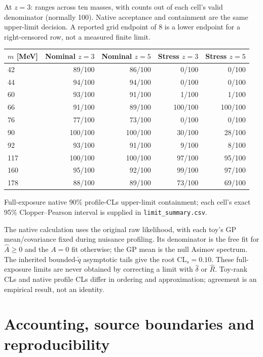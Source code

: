 \documentclass[10pt]{article}
\newcommand{\Ah}{\widehat A}\newcommand{\sh}{\widehat\sigma}
\newcommand{\CLs}{\mathrm{CL}_{s}}
\begin{document}
{\small At $z=3$: ranges across ten masses, with counts out of each cell's valid denominator (normally 100). Native acceptance and containment are the same upper-limit decision. A reported grid endpoint of 8 is a lower endpoint for a right-censored row, not a measured finite limit.\par}

\begin{center}\small\begin{tabular}{lrrrr}\toprule
$m$ [MeV] & Nominal $z=3$ & Nominal $z=5$ & Stress $z=3$ & Stress $z=5$\\\midrule
42 & 89/100 & 86/100 & 0/100 & 0/100\\
44 & 94/100 & 94/100 & 0/100 & 0/100\\
60 & 93/100 & 91/100 & 1/100 & 1/100\\
66 & 91/100 & 89/100 & 100/100 & 100/100\\
76 & 77/100 & 73/100 & 0/100 & 0/100\\
90 & 100/100 & 100/100 & 30/100 & 28/100\\
92 & 93/100 & 91/100 & 9/100 & 8/100\\
117 & 100/100 & 100/100 & 97/100 & 95/100\\
160 & 95/100 & 92/100 & 99/100 & 97/100\\
178 & 88/100 & 89/100 & 73/100 & 69/100\\
\bottomrule\end{tabular}\end{center}


{\small Full-exposure native 90\% profile-CLs upper-limit containment; each cell's exact 95\% Clopper--Pearson interval is supplied in \texttt{limit\_summary.csv}.\par}

The native calculation uses the original raw likelihood, with each toy's GP mean/covariance fixed during nuisance profiling. Its denominator is the free fit for $\Ah\geq0$ and the $A=0$ fit otherwise; the GP mean is the null Asimov spectrum. The inherited bounded-$\widetilde q$ asymptotic tails give the root $\CLs=0.10$. These full-exposure limits are never obtained by correcting a limit with $\widehat\delta$ or $\widehat R$. Toy-rank CLs and native profile CLs differ in ordering and approximation; agreement is an empirical result, not an identity.

\clearpage\section*{Accounting, source boundaries and reproducibility}
\end{document}
